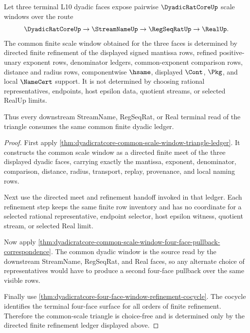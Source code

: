 \begin{theorem}
\label{thm:dyadicratcore-common-scale-choice-free-triangle}
Let three terminal L10 dyadic faces expose pairwise $\DyadicRatCoreUp$ scale
windows over the route
$$
\DyadicRatCoreUp \to \StreamNameUp \to \RegSeqRatUp \to \RealUp .
$$
The common finite scale window obtained for the three faces is determined by
directed finite refinement of the displayed signed mantissa rows, refined
positive-unary exponent rows, denominator ledgers, common-exponent comparison
rows, distance and radius rows, componentwise $\hsame$, displayed $\Cont$,
$\Pkg$, and local $\NameCert$ support. It is not determined by choosing
rational representatives, endpoints, host epsilon data, quotient streams, or
selected RealUp limits.

Thus every downstream StreamName, RegSeqRat, or Real terminal read of the
triangle consumes the same common finite dyadic ledger.
\end{theorem}
\begin{proof}
First apply \autoref{thm:dyadicratcore-common-scale-window-triangle-ledger}.
It constructs the common scale window as a directed finite meet of the three
displayed dyadic faces, carrying exactly the mantissa, exponent, denominator,
comparison, distance, radius, transport, replay, provenance, and local naming
rows.

Next use the directed meet and refinement handoff invoked in that ledger. Each
refinement step keeps the same finite row inventory and has no coordinate for
a selected rational representative, endpoint selector, host epsilon witness,
quotient stream, or selected Real limit.

Now apply
\autoref{thm:dyadicratcore-common-scale-window-four-face-pullback-correspondence}.
The common dyadic window is the source read by the downstream StreamName,
RegSeqRat, and Real faces, so any alternate choice of representatives would
have to produce a second four-face pullback over the same visible rows.

Finally use \autoref{thm:dyadicratcore-four-face-window-refinement-cocycle}.
The cocycle identifies the terminal four-face surface for all orders of
finite refinement. Therefore the common-scale triangle is choice-free and is
determined only by the directed finite refinement ledger displayed above.
\end{proof}

